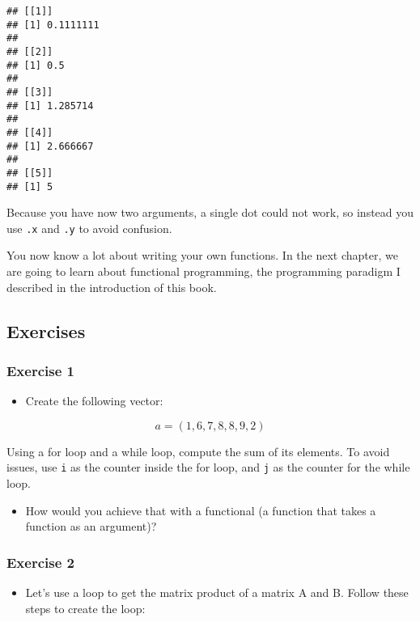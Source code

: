 \documentclass[
]{article}
\providecommand{\tightlist}{%
  \setlength{\itemsep}{0pt}\setlength{\parskip}{0pt}}
\begin{document}
\begin{verbatim}
## [[1]]
## [1] 0.1111111
## 
## [[2]]
## [1] 0.5
## 
## [[3]]
## [1] 1.285714
## 
## [[4]]
## [1] 2.666667
## 
## [[5]]
## [1] 5
\end{verbatim}

Because you have now two arguments, a single dot could not work, so instead you use \texttt{.x} and \texttt{.y} to
avoid confusion.

You now know a lot about writing your own functions. In the next chapter, we are going to learn about
functional programming, the programming paradigm I described in the introduction of this book.

\hypertarget{exercises-5}{%
\subsection{Exercises}\label{exercises-5}}

\hypertarget{exercise-1-5}{%
\subsubsection*{Exercise 1}\label{exercise-1-5}}

\begin{itemize}
\tightlist
\item
  Create the following vector:
\end{itemize}

\[a = (1,6,7,8,8,9,2)\]

Using a for loop and a while loop, compute the sum of its elements. To avoid issues, use \texttt{i}
as the counter inside the for loop, and \texttt{j} as the counter for the while loop.

\begin{itemize}
\tightlist
\item
  How would you achieve that with a functional (a function that takes a function as an argument)?
\end{itemize}

\hypertarget{exercise-2-3}{%
\subsubsection*{Exercise 2}\label{exercise-2-3}}

\begin{itemize}
\tightlist
\item
  Let's use a loop to get the matrix product of a matrix A and B. Follow these steps to create the loop:
\end{itemize}
\end{document}
